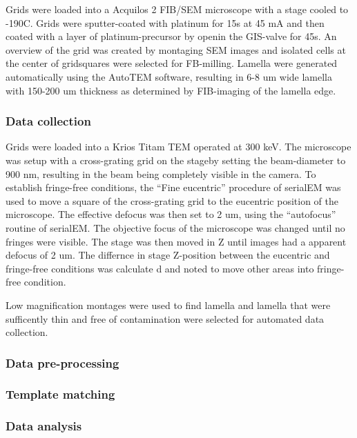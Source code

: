 \documentclass[
]{article}
\begin{document}
Grids were loaded into a Acquilos 2 FIB/SEM microscope with a stage cooled to -190C. Grids were sputter-coated with platinum for 15s at 45 mA and then coated with a layer of platinum-precursor by openin the GIS-valve for 45s. An overview of the grid was created by montaging SEM images and isolated cells at the center of gridsquares were selected for FB-milling. Lamella were generated automatically using the AutoTEM software, resulting in 6-8 um wide lamella with 150-200 um thickness as determined by FIB-imaging of the lamella edge.

\hypertarget{data-collection}{%
\subsubsection{Data collection}\label{data-collection}}

Grids were loaded into a Krios Titam TEM operated at 300 keV. The microscope was setup with a cross-grating grid on the stageby setting the beam-diameter to 900 nm, resulting in the beam being completely visible in the camera. To establish fringe-free conditions, the ``Fine eucentric'' procedure of serialEM was used to move a square of the cross-grating grid to the eucentric position of the microscope. The effective defocus was then set to 2 um, using the ``autofocus'' routine of serialEM. The objective focus of the microscope was changed until no fringes were visible. The stage was then moved in Z until images had a apparent defocus of 2 um. The differnce in stage Z-position between the eucentric and fringe-free conditions was calculate d and noted to move other areas into fringe-free condition.

Low magnification montages were used to find lamella and lamella that were sufficently thin and free of contamination were selected for automated data collection.

\hypertarget{data-pre-processing}{%
\subsubsection{Data pre-processing}\label{data-pre-processing}}

\hypertarget{template-matching}{%
\subsubsection{Template matching}\label{template-matching}}

\hypertarget{data-analysis}{%
\subsubsection{Data analysis}\label{data-analysis}}
\end{document}
